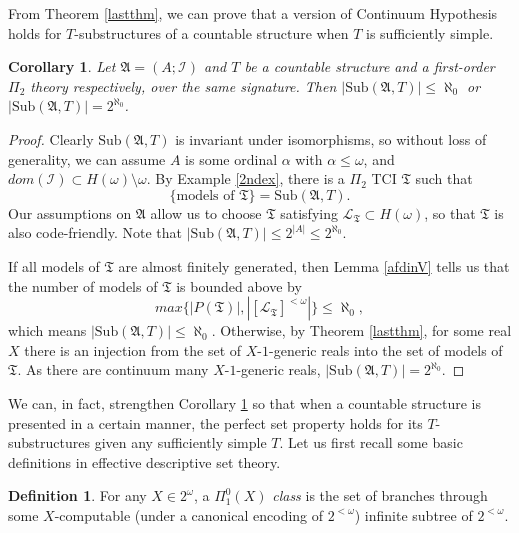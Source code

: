 \documentclass[12pt, twoside]{memoir}
\numberwithin{equation}{section}
\newtheorem{cor}[thm]{Corollary}
\theoremstyle{definition}
\newtheorem{defi}[thm]{Definition}
\theoremstyle{remark}
\theoremstyle{definition}
\theoremstyle{definition}
\theoremstyle{definition}
\theoremstyle{remark}
\begin{document}
From Theorem \ref{lastthm}, we can prove that a version of Continuum Hypothesis holds for $T$-substructures of a countable structure when $T$ is sufficiently simple.

\begin{cor}\label{lastcor}
Let $\mathfrak{A} = (A; \mathcal{I})$ and $T$ be a countable structure and a first-order $\Pi_2$ theory respectively, over the same signature. Then $|\mathrm{Sub}(\mathfrak{A}, T)| \leq \aleph_0$ or $|\mathrm{Sub}(\mathfrak{A}, T)| = 2^{\aleph_0}$.
\end{cor}

\begin{proof}
Clearly $\mathrm{Sub}(\mathfrak{A}, T)$ is invariant under isomorphisms, so without loss of generality, we can assume $A$ is some ordinal $\alpha$ with $\alpha \leq \omega$, and $dom(\mathcal{I}) \subset H(\omega) \setminus \omega$. By Example \ref{2ndex}, there is a $\Pi_2$ TCI $\mathfrak{T}$ such that $$\{ \text{models of } \mathfrak{T}\} = \mathrm{Sub}(\mathfrak{A}, T).$$ Our assumptions on $\mathfrak{A}$ allow us to choose $\mathfrak{T}$ satisfying $\mathcal{L}_{\mathfrak{T}} \subset H(\omega)$, so that $\mathfrak{T}$ is also code-friendly. Note that $|\mathrm{Sub}(\mathfrak{A}, T)| \leq 2^{|A|} \leq 2^{\aleph_0}$.

If all models of $\mathfrak{T}$ are almost finitely generated, then Lemma \ref{afdinV} tells us that the number of models of $\mathfrak{T}$ is bounded above by $$max\{|P(\mathfrak{T})|, |[\mathcal{L}_{\mathfrak{T}}]^{< \omega}|\} \leq \aleph_0,$$ which means $|\mathrm{Sub}(\mathfrak{A}, T)| \leq \aleph_0$. Otherwise, by Theorem \ref{lastthm}, for some real $X$ there is an injection from the set of $X$-$1$-generic reals into the set of models of $\mathfrak{T}$. As there are continuum many $X$-$1$-generic reals, $|\mathrm{Sub}(\mathfrak{A}, T)| = 2^{\aleph_0}$.
\end{proof}

We can, in fact, strengthen Corollary \ref{lastcor} so that when a countable structure is presented in a certain manner, the perfect set property holds for its $T$-substructures given any sufficiently simple $T$. Let us first recall some basic definitions in effective descriptive set theory.

\begin{defi}
For any $X \in 2^{\omega}$, a $\Pi^0_1(X)$ \emph{class} is the set of branches through some $X$-computable (under a canonical encoding of $2^{<\omega}$) infinite subtree of $2^{<\omega}$.
\end{defi}
\end{document}

